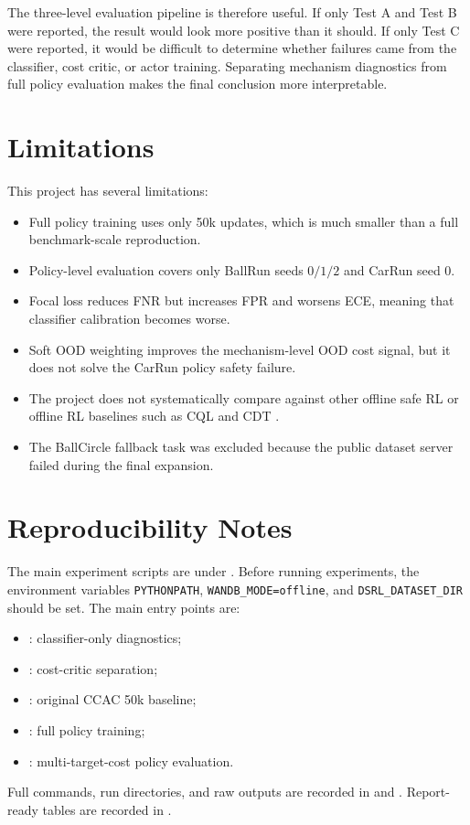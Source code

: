 \documentclass[11pt,a4paper]{article}
\newcommand{\ccac}{\textsc{CCAC}}
\begin{document}
The three-level evaluation pipeline is therefore useful. If only Test A and
Test B were reported, the result would look more positive than it should. If
only Test C were reported, it would be difficult to determine whether failures
came from the classifier, cost critic, or actor training. Separating mechanism
diagnostics from full policy evaluation makes the final conclusion more
interpretable.

\section{Limitations}

This project has several limitations:
\begin{itemize}
  \item Full policy training uses only 50k updates, which is much smaller than a
  full benchmark-scale reproduction.
  \item Policy-level evaluation covers only BallRun seeds \(0/1/2\) and CarRun
  seed 0.
  \item Focal loss reduces FNR but increases FPR and worsens ECE, meaning that
  classifier calibration becomes worse.
  \item Soft OOD weighting improves the mechanism-level OOD cost signal, but it
  does not solve the CarRun policy safety failure.
  \item The project does not systematically compare against other offline safe
  RL or offline RL baselines such as CQL \cite{kumar2020cql} and CDT
  \cite{liu2023cdt}.
  \item The BallCircle fallback task was excluded because the public dataset
  server failed during the final expansion.
\end{itemize}

\section{Reproducibility Notes}

The main experiment scripts are under
. Before running experiments, the
environment variables \texttt{PYTHONPATH}, \texttt{WANDB\_MODE=offline}, and
\texttt{DSRL\_DATASET\_DIR} should be set. The main entry points are:
\begin{itemize}
  \item {}: classifier-only diagnostics;
  \item {}: cost-critic separation;
  \item {}: original \ccac{} 50k baseline;
  \item {}: full policy training;
  \item {}: multi-target-cost policy
  evaluation.
\end{itemize}
Full commands, run directories, and raw outputs are recorded in
 and
. Report-ready tables are recorded
in .
\end{document}
